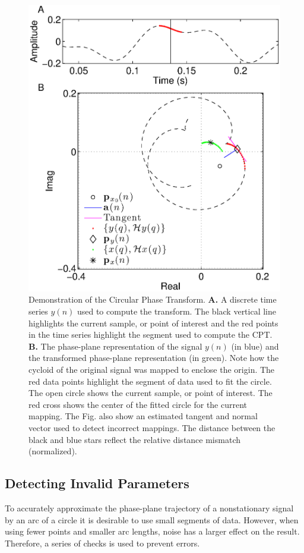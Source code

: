 \documentclass[a4paper]{IEEEtran}
\begin{document}
\begin{figure}
    \centering
    \includegraphics[scale=0.42]{./Figures/MappingDemonstration.eps}
    \caption[MappingDemo]{Demonstration of the Circular Phase Transform. \textbf{A.} A discrete time series $y(n)$ used to compute the transform. The black vertical line highlights the current sample, or point of interest and the red points in the time series highlight the segment used to compute the CPT. \textbf{B.} The phase-plane representation of the signal $y(n)$ (in blue) and the transformed phase-plane representation (in green). Note how the cycloid of the original signal was mapped to enclose the origin. The red data points highlight the segment of data used to fit the circle. The open circle shows the current sample, or point of interest. The red cross shows the center of the fitted circle for the current mapping. The Fig. also show an estimated tangent and normal vector used to detect incorrect mappings. The distance between the black and blue stars reflect the relative distance mismatch (normalized).}
    \label{fig:MappingDemo}
\end{figure}

\subsection{Detecting Invalid Parameters}\label{sect:DetectingInvalidParameters}
To accurately approximate the phase-plane trajectory of a nonstationary signal by an arc of a circle it is desirable to use small segments of data. However, when using fewer points and smaller arc lengths, noise has a larger effect on the result. Therefore, a series of checks is used to prevent errors. 
\end{document}
